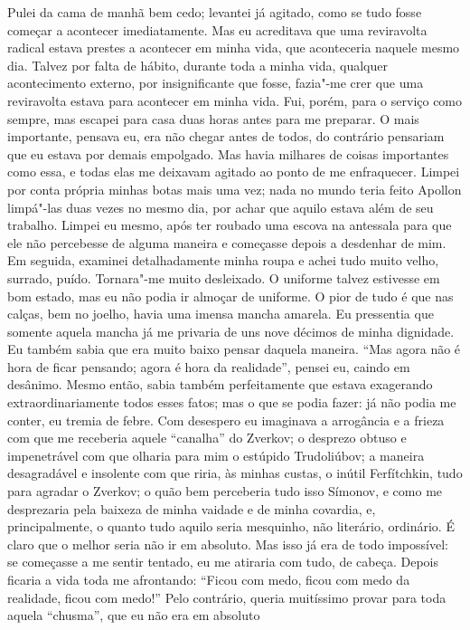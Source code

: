 Pulei da cama de manhã bem cedo; levantei já agitado, como se tudo fosse
começar a acontecer imediatamente. Mas eu acreditava que uma
reviravolta radical estava prestes a acontecer em minha vida, que
aconteceria naquele mesmo dia. Talvez por falta de hábito, durante toda
a minha vida, qualquer acontecimento externo, por insignificante que
fosse, fazia"-me crer que uma reviravolta estava para acontecer em minha
vida. Fui, porém, para o serviço como sempre, mas escapei para casa
duas horas antes para me preparar. O mais importante, pensava eu, era
não chegar antes de todos, do contrário pensariam que eu estava por
demais empolgado. Mas havia milhares de coisas importantes como essa, e
todas elas me deixavam agitado ao ponto de me enfraquecer. Limpei por
conta própria minhas botas mais uma vez; nada no mundo teria feito
Apollon limpá"-las duas vezes no mesmo dia, por achar que aquilo estava
além de seu trabalho. Limpei eu mesmo, após ter roubado uma escova na
antessala para que ele não percebesse de alguma maneira e começasse
depois a desdenhar de mim. Em seguida, examinei detalhadamente minha
roupa e achei tudo muito velho, surrado, puído. Tornara"-me muito
desleixado. O uniforme talvez estivesse em bom estado, mas eu não podia
ir almoçar de uniforme. O pior de tudo é que nas calças, bem no joelho,
havia uma imensa mancha amarela. Eu pressentia que somente aquela
mancha já me privaria de uns nove décimos de minha dignidade. Eu também
sabia que era muito baixo pensar daquela maneira. “Mas agora não é hora
de ficar pensando; agora é hora da realidade”, pensei eu, caindo em
desânimo. Mesmo então, sabia também perfeitamente que estava exagerando
extraordinariamente todos esses fatos; mas o que se podia fazer: já não
podia me conter, eu tremia de febre. Com desespero eu imaginava a
arrogância e a frieza com que me receberia aquele “canalha” do Zverkov;
o desprezo obtuso e impenetrável com que olharia para mim o estúpido
Trudoliúbov; a maneira desagradável e insolente com que riria, às
minhas custas, o inútil Ferfítchkin, tudo para agradar o Zverkov; o
quão bem perceberia tudo isso Símonov, e como me desprezaria pela
baixeza de minha vaidade e de minha covardia, e, principalmente, o
quanto tudo aquilo seria mesquinho, não literário, ordinário. É claro
que o melhor seria não ir em absoluto. Mas isso já era de todo
impossível: se começasse a me sentir tentado, eu me atiraria com tudo,
de cabeça. Depois ficaria a vida toda me afrontando: “Ficou com medo,
ficou com medo da realidade, ficou com medo!” Pelo contrário, queria
muitíssimo provar para toda aquela “chusma”, que eu não era em absoluto
